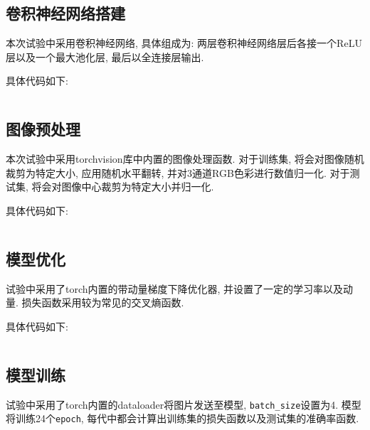 \subsection{卷积神经网络搭建}
本次试验中采用卷积神经网络, 具体组成为: 
两层卷积神经网络层后各接一个ReLU层以及一个最大池化层, 最后以全连接层输出.

具体代码如下:

\inputminted[firstline=3,linenos,breaklines]{python3}{code/cnn.py}

\subsection{图像预处理}

本次试验中采用torchvision库中内置的图像处理函数.
对于训练集, 将会对图像随机裁剪为特定大小, 应用随机水平翻转, 并对3通道RGB色彩进行数值归一化.
对于测试集, 将会对图像中心裁剪为特定大小并归一化.

具体代码如下:
\inputminted[firstline=3,linenos]{python3}{code/trans.py}

\subsection{模型优化}

试验中采用了torch内置的带动量梯度下降优化器, 并设置了一定的学习率以及动量.
损失函数采用较为常见的交叉熵函数.

具体代码如下:

\inputminted[firstline=41,lastline=42,linenos]{python3}{code/main.py}

\subsection{模型训练}

试验中采用了torch内置的dataloader将图片发送至模型, \texttt{batch\_size}设置为4.
模型将训练24个\texttt{epoch}, 每代中都会计算出训练集的损失函数以及测试集的准确率函数.